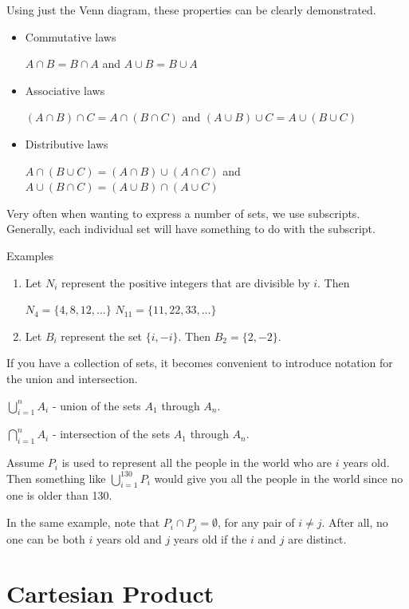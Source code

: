 \documentclass[12pt]{article}
\begin{document}
Using just the Venn diagram, these properties can be clearly demonstrated.

\begin{itemize}
\item Commutative laws

$A \cap B = B \cap A$ and $A \cup B = B \cup A$

\item Associative laws

$(A \cap B) \cap C = A \cap (B \cap C)$ and $(A \cup B) \cup C = A \cup (B \cup C)$

\item Distributive laws

$A \cap (B \cup C) = (A \cap B) \cup (A \cap C)$ and $A \cup (B \cap C) = (A \cup B) \cap (A \cup C)$
\end{itemize}

Very often when wanting to express a number of sets, we use subscripts. 
Generally, each individual set will have something to do with the subscript.

Examples

\begin{enumerate}
\item Let $N_i$ represent the positive integers that are divisible by $i$. Then

$N_4 = \{4,8,12,\ldots\}$
$N_{11} = \{11, 22, 33, \ldots\}$

\item Let $B_i$ represent the set $\{i,-i\}$. Then $B_2 = \{2,-2\}$.
\end{enumerate}

If you have a collection of sets, it becomes convenient to introduce notation for the union and intersection.

$\displaystyle \bigcup_{i=1}^n A_i$ - union of the sets $A_1$ through $A_n$.

$\displaystyle \bigcap_{i=1}^n A_i$ - intersection of the sets $A_1$ through $A_n$.

Assume $P_i$ is used to represent all the people in the world who are $i$ years old. 
Then something like $\displaystyle \bigcup_{i=1}^{130} P_i$ would give you all the people in the world since no one is older than 130. 

In the same example, note that $P_i \cap P_j = \emptyset$, for any pair of $i \neq j$. After all, no one can be both $i$ years old and $j$ years old if the $i$ and $j$ are distinct.

\section*{Cartesian Product}
\end{document}
